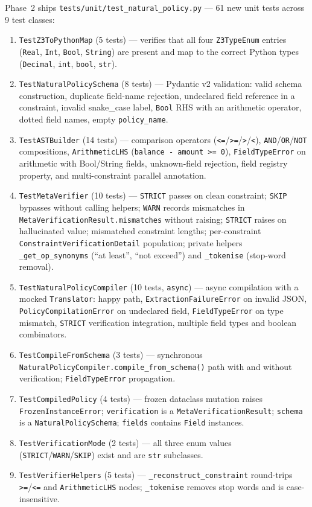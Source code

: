 \documentclass[12pt,a4paper,oneside]{report}
\newcommand{\fname}[1]{\texttt{#1}}          %
\newcommand{\code}[1]{\texttt{#1}}           %
\begin{document}
Phase~2 ships \fname{tests/unit/test\_natural\_policy.py} — 61 new unit tests
across 9 test classes:

\begin{enumerate}
\item \code{TestZ3ToPythonMap} (5 tests) — verifies that all four
  \code{Z3TypeEnum} entries (\code{Real}, \code{Int}, \code{Bool},
  \code{String}) are present and map to the correct Python types (\code{Decimal},
  \code{int}, \code{bool}, \code{str}).
\item \code{TestNaturalPolicySchema} (8 tests) — Pydantic v2 validation:
  valid schema construction, duplicate field-name rejection, undeclared field
  reference in a constraint, invalid snake\_case label, \code{Bool} RHS with
  an arithmetic operator, dotted field names, empty \code{policy\_name}.
\item \code{TestASTBuilder} (14 tests) — comparison operators
  (\code{<=}/\code{>=}/\code{>}/\code{<}), \code{AND}/\code{OR}/\code{NOT}
  compositions, \code{ArithmeticLHS} (\code{balance - amount >= 0}),
  \code{FieldTypeError} on arithmetic with Bool/String fields,
  unknown-field rejection, field registry property, and multi-constraint
  parallel annotation.
\item \code{TestMetaVerifier} (10 tests) — \code{STRICT} passes on clean
  constraint; \code{SKIP} bypasses without calling helpers; \code{WARN}
  records mismatches in \code{MetaVerificationResult.mismatches} without
  raising; \code{STRICT} raises on hallucinated value; mismatched constraint
  lengths; per-constraint \code{ConstraintVerificationDetail} population;
  private helpers \code{\_get\_op\_synonyms} (``at least'',
  ``not exceed'') and \code{\_tokenise} (stop-word removal).
\item \code{TestNaturalPolicyCompiler} (10 tests, \code{async}) — async
  compilation with a mocked \code{Translator}: happy path,
  \code{ExtractionFailureError} on invalid JSON,
  \code{PolicyCompilationError} on undeclared field, \code{FieldTypeError}
  on type mismatch, \code{STRICT} verification integration, multiple
  field types and boolean combinators.
\item \code{TestCompileFromSchema} (3 tests) — synchronous
  \code{NaturalPolicyCompiler.compile\_from\_schema()} path with and without
  verification; \code{FieldTypeError} propagation.
\item \code{TestCompiledPolicy} (4 tests) — frozen dataclass mutation raises
  \code{FrozenInstanceError}; \code{verification} is a
  \code{MetaVerificationResult}; \code{schema} is a
  \code{NaturalPolicySchema}; \code{fields} contains \code{Field} instances.
\item \code{TestVerificationMode} (2 tests) — all three enum values
  (\code{STRICT}/\code{WARN}/\code{SKIP}) exist and are \code{str}
  subclasses.
\item \code{TestVerifierHelpers} (5 tests) — \code{\_reconstruct\_constraint}
  round-trips \code{>=}/\code{<=} and \code{ArithmeticLHS} nodes;
  \code{\_tokenise} removes stop words and is case-insensitive.
\end{enumerate}
\end{document}

